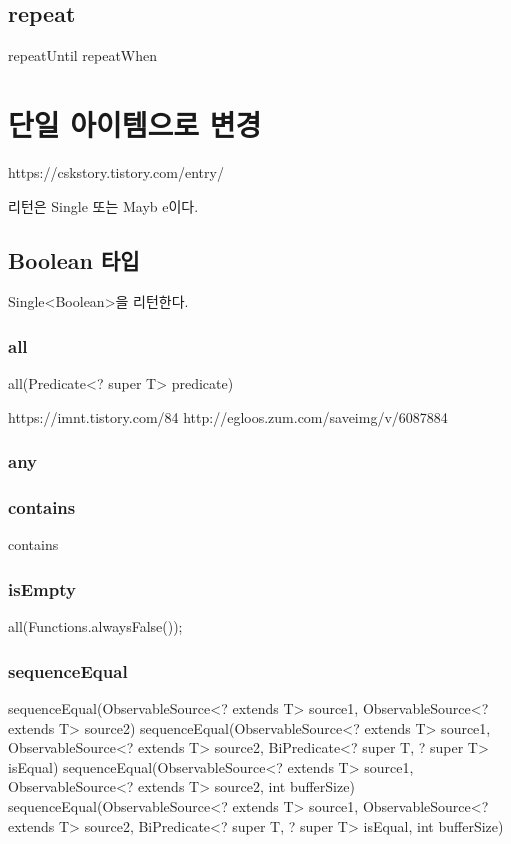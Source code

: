 \documentclass{book}
\begin{document}
{\subsection{repeat}
repeatUntil
repeatWhen


\section{단일 아이템으로 변경}
https://cskstory.tistory.com/entry/%

리턴은 Single 또는  Mayb e이다.

\subsection{Boolean 타입}       
Single<Boolean>을 리턴한다.           
\subsubsection{all}
all(Predicate<? super T> predicate)

https://imnt.tistory.com/84
http://egloos.zum.com/saveimg/v/6087884
\subsubsection{any}

\subsubsection{contains}
contains

\subsubsection{isEmpty}
all(Functions.alwaysFalse());

\subsubsection{sequenceEqual}

sequenceEqual(ObservableSource<? extends T> source1, ObservableSource<? extends T> source2)
sequenceEqual(ObservableSource<? extends T> source1, ObservableSource<? extends T> source2,
            BiPredicate<? super T, ? super T> isEqual)
            sequenceEqual(ObservableSource<? extends T> source1, ObservableSource<? extends T> source2,
            int bufferSize)
sequenceEqual(ObservableSource<? extends T> source1, ObservableSource<? extends T> source2,
            BiPredicate<? super T, ? super T> isEqual, int bufferSize)

}
\end{document}

